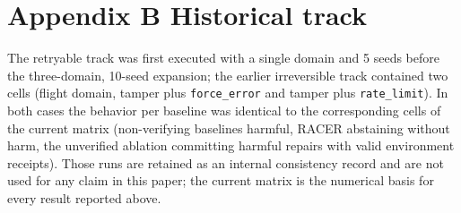 \documentclass[review]{fcs}
\begin{document}
\section*{Appendix B Historical track}

The retryable track was first executed with a single domain and 5 seeds before the three-domain, 10-seed expansion; the earlier irreversible track contained two cells (flight domain, tamper plus \texttt{force\_error} and tamper plus \texttt{rate\_limit}). In both cases the behavior per baseline was identical to the corresponding cells of the current matrix (non-verifying baselines harmful, RACER abstaining without harm, the unverified ablation committing harmful repairs with valid environment receipts). Those runs are retained as an internal consistency record and are not used for any claim in this paper; the current matrix is the numerical basis for every result reported above.
\end{document}

